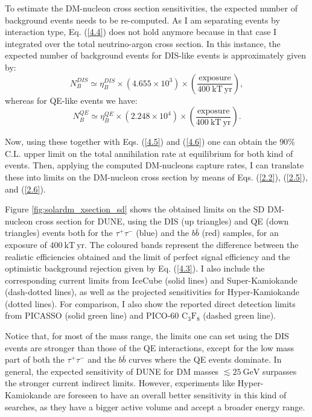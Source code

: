 To estimate the DM-nucleon cross section sensitivities, the expected number of background events needs to be re-computed. As I am separating events by interaction type, Eq. (\ref{4.4}) does not hold anymore because in that case I integrated over the total neutrino-argon cross section. In this instance, the expected number of background events for DIS-like events is approximately given by:
\begin{equation}\label{6.11}
	N_{B}^{DIS} \simeq \eta_{B}^{DIS} \times \left(4.655 \times 10^{3}\right) \times \left(\frac{\mathrm{exposure}}{400 \ \mathrm{kT} \ \mathrm{yr}}\right),
\end{equation}
whereas for QE-like events we have:
\begin{equation}\label{6.12}
	N_{B}^{QE} \simeq \eta_{B}^{QE} \times \left(2.248\times 10^{4}\right) \times \left(\frac{\mathrm{exposure}}{400 \ \mathrm{kT} \ \mathrm{yr}}\right).
\end{equation}

Now, using these together with Eqs. (\ref{4.5}) and (\ref{4.6}) one can obtain the $90\%$ C.L. upper limit on the total annihilation rate at equilibrium for both kind of events. Then, applying the computed DM-nucleons capture rates, I can translate these into limits on the DM-nucleon cross section by means of Eqs. (\ref{2.2}), (\ref{2.5}), and (\ref{2.6}).

Figure \ref{fig:solardm_xsection_sd} shows the obtained limits on the SD DM-nucleon cross section for DUNE, using the DIS (up triangles) and QE (down triangles) events both for the $\tau^{+}\tau^{-}$ (blue) and the $b\bar{b}$ (red) samples, for an exposure of $400 \ \mathrm{kT} \ \mathrm{yr}$. The coloured bands represent the difference between the realistic efficiencies obtained and the limit of perfect signal efficiency and the optimistic background rejection given by Eq. (\ref{4.3}). I also include the corresponding current limits from IceCube \cite{IceCube2021} (solid lines) and Super-Kamiokande \cite{Super-Kamiokande2015} (dash-dotted lines), as well as the projected sensitivities for Hyper-Kamiokande \cite{Bell2021} (dotted lines). For comparison, I also show the reported direct detection limits from PICASSO \cite{Behnke2016} (solid green line) and PICO-60 $\mathrm{C}_{3}\mathrm{F}_{8}$ \cite{PICO2019} (dashed green line).

Notice that, for most of the mass range, the limits one can set using the DIS events are stronger than those of the QE interactions, except for the low mass part of both the $\tau^{+}\tau^{-}$ and the $b\bar{b}$ curves where the QE events dominate. In general, the expected sensitivity of DUNE for DM masses $\lesssim 25 \ \mathrm{GeV}$ surpasses the stronger current indirect limits. However, experiments like Hyper-Kamiokande are foreseen to have an overall better sensitivity in this kind of searches, as they have a bigger active volume and accept a broader energy range.


